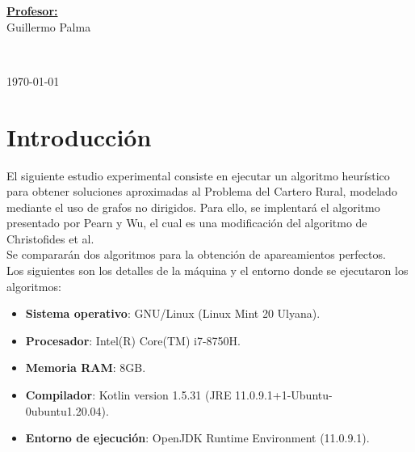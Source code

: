 \documentclass[11pt]{article}
\begin{document}
\begin{center}
   \begin{minipage}{\textwidth}    
      \vspace{-0.6cm}  
      \begin{flushright} \large    
         \textbf{\underline{Profesor:}} \\  
         Guillermo Palma  
      \end{flushright}        
   \end{minipage} 

   \vspace*{1cm}
   \\
   \vspace{2cm}  

   \begin{center} 
      {\large \today} 
   \end{center}     
\end{center}                                                      
                                                               
\newpage
                                                    
\section{Introducción}

El siguiente estudio experimental consiste en ejecutar un algoritmo heurístico para
obtener soluciones aproximadas al Problema del Cartero Rural, modelado mediante el uso de
grafos no dirigidos. Para ello, se implentará el algoritmo presentado por Pearn y Wu, el
cual es una modificación del algoritmo de Christofides et al. \\

Se compararán dos algoritmos para la obtención de apareamientos perfectos. \\

Los siguientes son los detalles de la máquina y el entorno donde se ejecutaron los algoritmos:

\begin{itemize}
   \item \textbf{Sistema operativo}: GNU/Linux (Linux Mint 20 Ulyana).
   \item \textbf{Procesador}: Intel(R) Core(TM) i7-8750H.
   \item \textbf{Memoria RAM}: 8GB.
   \item \textbf{Compilador}: Kotlin version 1.5.31 (JRE 11.0.9.1+1-Ubuntu-0ubuntu1.20.04).
   \item \textbf{Entorno de ejecución}: OpenJDK Runtime Environment (11.0.9.1).
\end{itemize}
\end{document}
